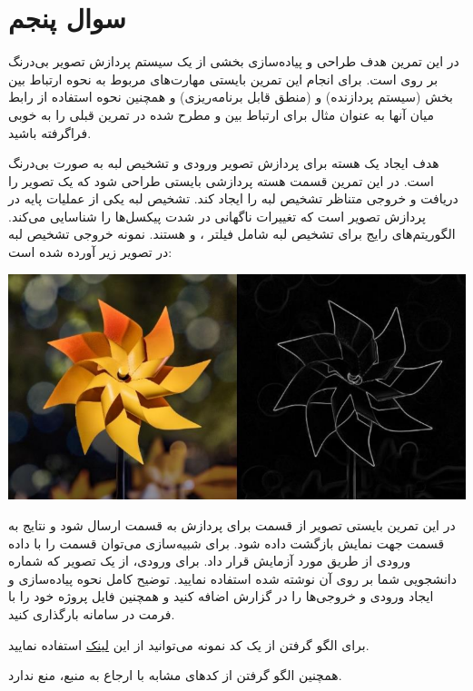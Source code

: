 \section{سوال پنجم}

در این تمرین هدف طراحی و پیاده‌سازی بخشی از یک سیستم پردازش تصویر بی‌درنگ بر روی  است. برای انجام این تمرین بایستی مهارت‌های مربوط به نحوه ارتباط بین بخش  (سیستم پردازنده) و  (منطق قابل برنامه‌ریزی) و همچنین نحوه استفاده از رابط میان آنها به عنوان مثال  برای ارتباط بین  و  مطرح شده در تمرین قبلی را به خوبی فراگرفته باشید.

هدف ایجاد یک هسته برای پردازش تصویر ورودی و تشخیص لبه به صورت بی‌درنگ است. در این تمرین قسمت هسته پردازشی بایستی طراحی شود که یک تصویر را دریافت و خروجی متناظر تشخیص لبه را ایجاد کند. تشخیص لبه یکی از عملیات پایه در پردازش تصویر است که تغییرات ناگهانی در شدت پیکسل‌ها را شناسایی می‌کند. الگوریتم‌های رایج برای تشخیص لبه شامل فیلتر ،  و  هستند. نمونه خروجی تشخیص لبه در تصویر زیر آورده شده است:

\begin{center}
	\includegraphics*[width=0.8\linewidth]{pics/img1.png}
	\label{تشخیص لبه در تصویر}
\end{center}


در این تمرین بایستی تصویر از قسمت  برای پردازش به قسمت  ارسال شود و نتایج به قسمت  جهت نمایش بازگشت داده شود. برای شبیه‌سازی می‌توان قسمت  را با داده ورودی از طریق  مورد آزمایش قرار داد. برای ورودی، از یک تصویر که شماره دانشجویی شما بر روی آن نوشته شده استفاده نمایید. توضیح کامل نحوه پیاده‌سازی و ایجاد ورودی و خروجی‌ها را در گزارش اضافه کنید و همچنین فایل پروژه خود را با فرمت  در سامانه بارگذاری کنید.

برای الگو گرفتن از یک کد نمونه می‌توانید از این
\href{https://github.com/JeffreySamuel/canny_edge_detection_in_FPGA/tree/main}{لینک}
 استفاده نمایید.
 
 همچنین الگو گرفتن از کدهای مشابه با ارجاع به منبع، منع ندارد.




